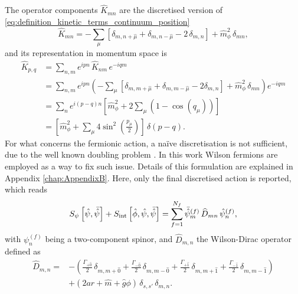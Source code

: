 The operator components $\widehat{K}_{mn}$ are the discretised version of \eqref{eq:definition_kinetic_terms_continuum_position}
\begin{equation}
    \widehat{K}_{mn} = - \sum_\mu \left[\delta_{m,n+\hat\mu} + \delta_{m,n-\hat\mu} - 2 \, \delta_{m,n}\right] + \hat{m}_\phi^2 \, \delta_{mn},
    \label{eq:discretised_kinetic_op_bosons}
\end{equation}
and its representation in momentum space is
\begin{equation*}
	\begin{aligned}
		\widehat{K}_{p, q} & =\sum_{n, m} e^{i p n} \, \widehat{K}_{n m} \, e^{-i q m} \\
		& =\sum_{n, m} e^{i p n}\left(-\sum_\mu\left[\delta_{m,m+\hat\mu}+\delta_{m,m-\hat\mu}-2 \delta_{m, n}\right] + \hat{m}_\phi^2 \, \delta_{mn}\right) e^{-i q m} \\
		& =\sum_{n} e^{i(p-q) n}\left[\hat{m}_\phi^2+2\sum_\mu \left(1-\cos \left(q_\mu\right)\right)\right] \\
		& = \left[\hat{m}_\phi^2 + \sum_\mu 4 \sin ^2\left(\frac{p_\mu}{2}\right) \right] \, \delta(p-q) .
	\end{aligned}
\end{equation*}
For what concerns the fermionic action, a na\"ive discretisation is not sufficient, due to the well known doubling problem \cite{rothe_LGT,Montvay1994QuantumLattice}. In this work Wilson fermions \cite{wilson_lqcd} are employed as a way to fix such issue. Details of this formulation are explained in Appendix \ref{chap:AppendixB}. Here, only the final discretised action is reported, which reads
\begin{equation}
		S_\psi\left[\hat{\psi}, \bar{\hat{\psi}} \right] + S_\text{int}\left[\hat{\phi}, \hat{\psi}, \bar{\hat{\psi}} \right] = \sum_{f=1}^{N_f}\bar{\hat{\psi}}_m^{(f)} \, \widehat{D}_{mn} \, \hat{\psi}_n^{(f)},
\end{equation}
with $\psi_n^{(f)}$ being a two-component spinor, and $\widehat{D}_{m,n}$ the Wilson-Dirac operator defined as 
\begin{equation}
    \begin{aligned}
    \widehat{D}_{m, n} = &- \left(\frac{\Gamma_{+\hat 0}}{2} \, \delta_{m, m+\hat 0} +\frac{\Gamma_{-\hat 0}}{2} \, \delta_{m, m-\hat 0} + \frac{\Gamma_{+\hat 1}}{2} \, \delta_{m, m+\hat 1} + \frac{\Gamma_{- \hat 1}}{2} \, \delta_{m, m-\hat 1}\right)  \\
     &+ \left(2ar + \hat m + \hat g \phi\right) \, \delta_{s,s'} \, \delta_{m,n}. \\
    \end{aligned}
    \label{eq:wilson-dirac_operator}
\end{equation}
